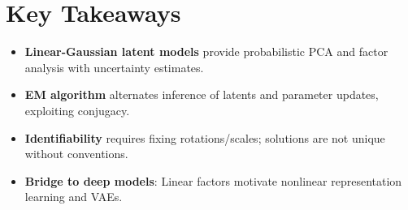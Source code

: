 
\section*{Key Takeaways}

\begin{keytakeaways}
\begin{itemize}[leftmargin=2em]
    \item \textbf{Linear-Gaussian latent models} provide probabilistic PCA and factor analysis with uncertainty estimates.
    \item \textbf{EM algorithm} alternates inference of latents and parameter updates, exploiting conjugacy.
    \item \textbf{Identifiability} requires fixing rotations/scales; solutions are not unique without conventions.
    \item \textbf{Bridge to deep models}: Linear factors motivate nonlinear representation learning and VAEs.
\end{itemize}
\end{keytakeaways}



